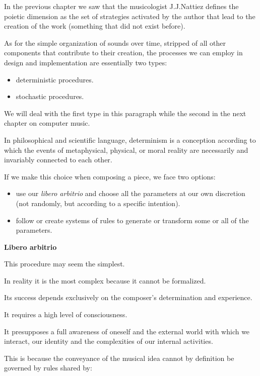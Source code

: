 In the previous chapter we saw that the musicologist J.J.Nattiez defines the poietic dimension as the set of strategies activated by the author that lead to the creation of the work (something that did not exist before).

As for the simple organization of sounds over time, stripped of all other components that contribute to their creation, the processes we can employ in design and implementation are essentially two types:

\begin{itemize}
\tightlist
\item deterministic procedures.
\item stochastic procedures.
\end{itemize}

We will deal with the first type in this paragraph while the second in the next chapter on computer music.

In philosophical and scientific language, determinism is a conception according to which the events of metaphysical, physical, or moral reality are necessarily and invariably connected to each other.

If we make this choice when composing a piece, we face two options:

\begin{itemize}
\tightlist
\item use our \textit{libero arbitrio} and choose all the parameters at our own discretion (not randomly, but according to a specific intention).
\item follow or create systems of rules to generate or transform some or all of the parameters.
\end{itemize}

\textbf{Libero arbitrio}\label{libero-arbitrio}

This procedure may seem the simplest.

In reality it is the most complex because it cannot be formalized.

Its success depends exclusively on the composer's determination and experience.

It requires a high level of consciousness.

It presupposes a full awareness of oneself and the external world with which we interact, our identity and the complexities of our internal activities.

This is because the conveyance of the musical idea cannot by definition be governed by rules shared by:

